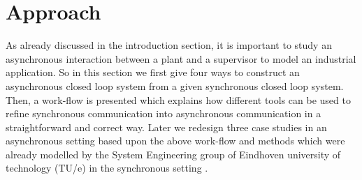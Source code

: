 \documentclass[a4paper,english,final]{article}
\theoremstyle{plain}
\theoremstyle{definition}
\begin{document}
\section{Approach}\label{sec-casestudies}
As already discussed in the introduction section, it is important to study an asynchronous interaction between a plant and a supervisor to model an industrial application. So in this section we first give four ways to construct an asynchronous closed loop system from a given synchronous closed loop system. Then, a work-flow is presented which explains how different tools can be used to refine synchronous communication into asynchronous communication in a straightforward and correct way. Later we redesign three case studies in an asynchronous setting based upon the above work-flow and methods which were already modelled by the System Engineering group of Eindhoven university of technology (TU/e) in the synchronous setting \cite{4k460}.
\end{document}
